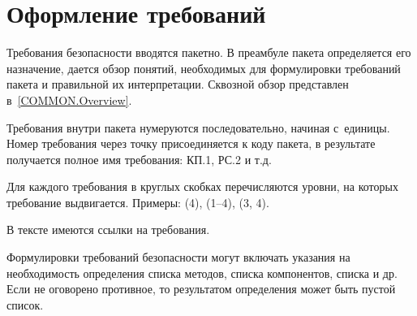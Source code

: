 \section{Оформление требований}\label{COMMON.Notation}

Требования безопасности вводятся пакетно. В преамбуле пакета определяется 
его назначение, дается обзор понятий, необходимых для формулировки 
требований пакета и правильной их интерпретации.
%
Сквозной обзор представлен в~\ref{COMMON.Overview}.

Требования внутри пакета нумеруются последовательно, начиная с~единицы.
%
Номер требования через точку присоединяется к коду пакета, 
в результате получается полное имя требования: КП.1, РС.2 и т.д.

Для каждого требования в круглых скобках перечисляются уровни, 
на которых требование выдвигается.
Примеры: (4), (1--4), (3, 4).

В тексте имеются ссылки на требования. 
%
%

Формулировки требований безопасности могут включать указания на 
необходимость определения списка методов, списка компонентов, 
списка  и др.
%
Если не оговорено противное, то результатом определения 
может быть пустой список.
